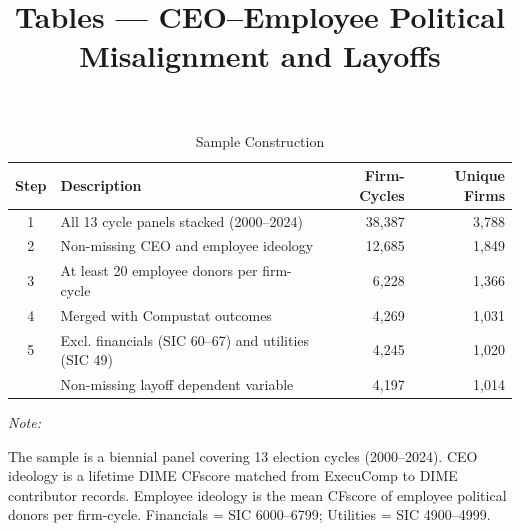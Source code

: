 \documentclass[
  10pt,
]{article}
\title{Tables --- CEO--Employee Political Misalignment and Layoffs}
\author{}
\date{\vspace{-2.5em}}
\begin{document}
\maketitle

\begin{table}[!h]
\centering
\caption{\label{tab:table1}Sample Construction}
\centering
\fontsize{9}{11}\selectfont
\begin{threeparttable}
\begin{tabular}[t]{clrr}
\toprule
Step & Description & Firm-Cycles & Unique Firms\\
\midrule
1 & All 13 cycle panels stacked (2000--2024) & 38,387 & 3,788\\
2 & Non-missing CEO and employee ideology & 12,685 & 1,849\\
3 & At least 20 employee donors per firm-cycle & 6,228 & 1,366\\
4 & Merged with Compustat outcomes & 4,269 & 1,031\\
5 & Excl. financials (SIC 60--67) and utilities (SIC 49) & 4,245 & 1,020\\
\addlinespace
6 & Non-missing layoff dependent variable & 4,197 & 1,014\\
\bottomrule
\end{tabular}
\begin{tablenotes}[para]
\item \textit{Note: } 
\item The sample is a biennial panel covering 13 election cycles (2000--2024). CEO ideology is a lifetime DIME CFscore matched from ExecuComp to DIME contributor records. Employee ideology is the mean CFscore of employee political donors per firm-cycle. Financials = SIC 6000--6799; Utilities = SIC 4900--4999.
\end{tablenotes}
\end{threeparttable}
\end{table}

\newpage
\end{document}
